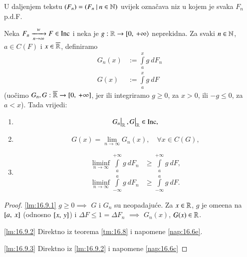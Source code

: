 U daljenjem tekstu $(F_n) = ({F_n} \: | \: {n \in \mathbb{N}})$ uvijek ozna\v cava niz u kojem je svaka $F_n$ p.d.F.

\begin{lm}  \label{lm:16.9}
    Neka $F_n \xrightarrow[n \to \infty]{w} F \in \mathrm{Inc}$ i neka je $g: \mathbb{R} \to [ {0}, \: {+\infty} \rangle$ neprekidna.
    Za svaki $n \in \mathbb{N}$, $a \in C(F)$ i $x \in \overline{\mathbb{R}}$, definiramo
    \begin{equation*}
        \begin{aligned}
            G_n (x) &:= \int\limits_a^x g \: d F_n\\
            G(x) &:= \int\limits_a^x g \: d F
        \end{aligned}
    \end{equation*}
    (uo\v cimo $G_n, G : \overline{\mathbb{R}} \to [{0}, \:{+\infty}]$, jer ili integriramo $g \geq 0$, za $x > 0$, ili $-g \leq 0$, za $a < x$).
    Tada vrijedi:
    \begin{enumerate}[label=(\roman*)]
        \item \label{lm:16.9.1}
        \begin{equation*}
            \restr{G_n}{\real}, \restr{G}{\real} \in \inc,
        \end{equation*}
        \item \label{lm:16.9.2}
        \begin{equation*}
            G (x) = \lim_{n \to \infty} G_n(x), \quad \forall x \in C(G),
        \end{equation*}
        \item \label{lm:16.9.3}
        \begin{equation*}
            \begin{aligned}
                \liminf\limits_{n \to \infty} \int\limits_a^{+\infty} g \: d F_n &\geq \int\limits_a^{+\infty} g \: d F,\\
                \liminf\limits_{n \to \infty} \int\limits_{-\infty}^a g \: d F_n &\geq \int\limits_{-\infty}^a g \: d F.
            \end{aligned}
        \end{equation*}
    \end{enumerate}
\end{lm}

\begin{proof}
    \ref{lm:16.9.1} $g \geq 0 \implies$ $G$ i $G_n$ su neopadaju\' ce.
    Za $x \in \mathbb{R}$, $g$ je ome\dj ena na $[{a}, \:{x}]$ (odnosno $[{x}, \:{y}]$) i $\Delta F \leq 1 = \Delta F_n$ $\implies$ $G_n (x)$, $G(x) \in \mathbb{R}$.

    \ref{lm:16.9.2} Direktno iz teorema \ref{tm:16.8} i napomene \ref{nap:16.6e}.

    \ref{lm:16.9.3} Direktno iz \ref{lm:16.9.2} i napomene \ref{nap:16.6c}
\end{proof}

